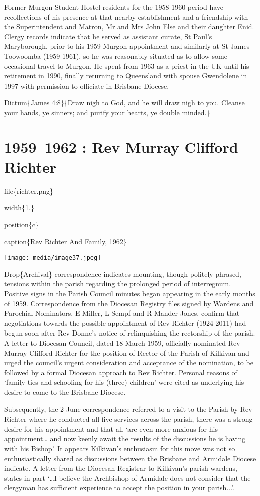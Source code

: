 Former Murgon Student Hostel residents for the 1958-1960 period have recollections of his presence at that nearby establishment and a friendship with the Superintendent and Matron, Mr and Mrs John Else and their daughter Enid. Clergy records indicate that he served as assistant curate, St Paul's Maryborough, prior to his 1959 Murgon appointment and similarly at St James Toowoomba (1959-1961), so he was reasonably situated as to allow some occasional travel to Murgon. He spent from 1963 as a priest in the UK until his retirement in 1990, finally returning to Queensland with spouse Gwendolene in 1997 with permission to officiate in Brisbane Diocese.

Dictum\{James 4:8\}\{Draw nigh to God, and he will draw nigh to you. Cleanse your hands, ye sinners; and purify your hearts, ye double minded.\}

\hypertarget{rev-murray-clifford-richter}{%
\chapter{1959--1962 : Rev Murray Clifford Richter}\label{rev-murray-clifford-richter}}

file\{richter.png\}

width\{1.\}

position\{c\}

caption\{Rev Richter And Family, 1962\}

\texttt{[image: media/image37.jpeg]}

Drop\{Archival\} correspondence indicates mounting, though politely phrased, tensions within the parish regarding the prolonged period of interregnum. Positive signs in the Parish Council minutes began appearing in the early months of 1959. Correspondence from the Diocesan Registry files signed by Wardens and Parochial Nominators, E Miller, L Sempf and R Mander-Jones, confirm that negotiations towards the possible appointment of Rev Richter (1924-2011) had begun soon after Rev Donne's notice of relinquishing the rectorship of the parish. A letter to Diocesan Council, dated 18 March 1959, officially nominated Rev Murray Clifford Richter for the position of Rector of the Parish of Kilkivan and urged the council's urgent consideration and acceptance of the nomination, to be followed by a formal Diocesan approach to Rev Richter. Personal reasons of `family ties and schooling for his (three) children' were cited as underlying his desire to come to the Brisbane Diocese.

Subsequently, the 2 June correspondence referred to a visit to the Parish by Rev Richter where he conducted all five services across the parish, there was a strong desire for his appointment and that all `are even more anxious for his appointment\ldots{} and now keenly await the results of the discussions he is having with his Bishop'. It appears Kilkivan's enthusiasm for this move was not so enthusiastically shared as discussions between the Brisbane and Armidale Diocese indicate. A letter from the Diocesan Registrar to Kilkivan's parish wardens, states in part `\ldots I believe the Archbishop of Armidale does not consider that the clergyman has sufficient experience to accept the position in your parish...'.

